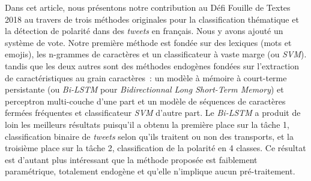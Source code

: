 
 Dans cet article, nous présentons notre contribution au Défi Fouille de Textes 2018 au travers de trois méthodes originales pour la classification thématique et la détection de polarité dans des \textit{tweets} en français. Nous y avons ajouté un système de vote.
 Notre première méthode est fondée sur des lexiques (mots et emojis),
 les n-grammes de caractères et un classificateur à vaste marge (ou \textit{SVM}).
 tandis que les deux autres sont des méthodes endogènes fondées sur l'extraction de caractéristiques au grain caractères~: un modèle à mémoire à court-terme persistante (ou \textit{Bi-LSTM} pour \textit{Bidirectionnal Long Short-Term Memory}) et perceptron multi-couche d'une part et un modèle de séquences de caractères fermées fréquentes et classificateur \textit{SVM} d'autre part.
 Le \textit{Bi-LSTM} a produit de loin les meilleurs résultats puisqu'il a obtenu la première place sur la tâche 1, classification binaire de \textit{tweets} selon qu'ils traitent ou non des transports, et la troisième place sur la tâche 2, classification de la polarité en 4 classes.
 Ce résultat est d'autant plus intéressant que la méthode proposée est faiblement paramétrique, totalement endogène et qu'elle n'implique aucun pré-traitement.

